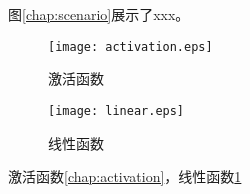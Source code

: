 图\ref{chap:scenario}展示了xxx。

\begin{figure}[!htb]
	\centering
	\begin{minipage}{0.48\textwidth}
		\texttt{[image: activation.eps]}
		\caption{激活函数}
		\label{chap:activation}
	\end{minipage}
	\begin{minipage}{0.48\textwidth}
		\texttt{[image: linear.eps]}
		\caption{线性函数}
		\label{chap:linear}
	\end{minipage}
\end{figure}

激活函数\ref{chap:activation}，线性函数\ref{chap:linear}

